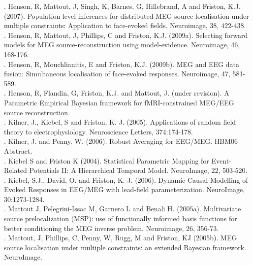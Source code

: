 . Henson, R, Mattout, J, Singh, K, Barnes, G, Hillebrand, A and Friston, K.J. (2007). Population-level inferences for distributed MEG source localisation under multiple constraints: Application to face-evoked fields. Neuroimage, 38, 422-438.\\

. Henson, R, Mattout, J, Phillips, C and Friston, K.J. (2009a). Selecting forward models for MEG source-reconstruction using model-evidence. Neuroimage, 46, 168-176.\\

. Henson, R, Mouchlianitis, E and Friston, K.J. (2009b). MEG and EEG data fusion: Simultaneous localisation of face-evoked responses. Neuroimage, 47, 581-589.\\

. Henson, R, Flandin, G, Friston, K.J. and Mattout, J. (under revision). A Parametric Empirical Bayesian framework for fMRI-constrained MEG/EEG source reconstruction.\\

. Kilner, J., Kiebel, S and Friston, K. J. (2005). Applications of random field theory to electrophysiology. Neuroscience Letters, 374:174-178.\\

. Kilner, J. and Penny. W. (2006). Robust Averaging for EEG/MEG. HBM06 Abstract.\\

. Kiebel S and Friston K (2004). Statistical Parametric Mapping for Event-Related Potentials II: A Hierarchical Temporal Model. NeuroImage, 22, 503-520.\\

. Kiebel, S.J., David, O. and Friston, K. J. (2006). Dynamic Causal Modelling of Evoked Responses in EEG/MEG with lead-field parameterization. NeuroImage, 30:1273-1284.\\

. Mattout J, Pelegrini-Issac M, Garnero L and Benali H. (2005a). Multivariate source prelocalization (MSP): use of functionally informed basis functions for better conditioning the MEG inverse problem. Neuroimage, 26, 356-73.\\

. Mattout, J, Phillips, C, Penny, W, Rugg, M and Friston, KJ (2005b). MEG source localisation under multiple constraints: an extended Bayesian framework. NeuroImage.\\

